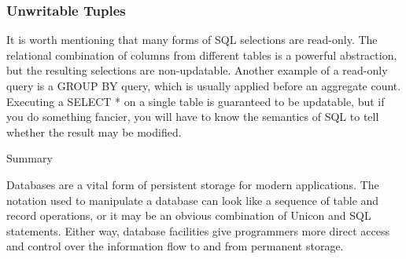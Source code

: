 \subsubsection{Unwritable Tuples}
It is worth mentioning that many forms of SQL selections are read-only.
The relational combination of columns from different tables is a
powerful abstraction, but the resulting selections are non-updatable.
Another example of a read-only query is a \textsf{GROUP BY} query,
which is usually applied before an aggregate count. Executing a
\textsf{SELECT *} on a single table is guaranteed to be updatable, but
if you do something fancier, you will have to know the semantics of SQL
to tell whether the result may be modified.

{\sffamily
Summary}

Databases are a vital form of persistent storage for modern
applications. The notation used to manipulate a database can look like
a sequence of table and record operations, or it may be an obvious
combination of Unicon and SQL statements. Either way, database
facilities give programmers more direct access and control over the
information flow to and from permanent storage.


\bigskip

